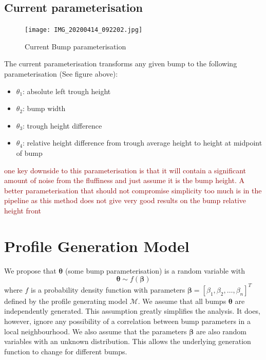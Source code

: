 \documentclass[12pt]{report}
\newcommand{\tcr}[1]{\textcolor{darkRed}{#1}}
\begin{document}
        \subsection{Current parameterisation}
            \begin{figure}
                \centering
                \texttt{[image: IMG\_20200414\_092202.jpg]}
                \caption{Current Bump parameterisation}
            \end{figure}
            The current parameterisation transforms any given bump to the following parameterisation (See figure above):
            \begin{itemize}
                \item $\theta_1$: absolute left trough height
                \item $\theta_2$: bump width
                \item $\theta_3$: trough height difference
                \item $\theta_4$: relative height difference from trough average height to height at midpoint of bump 
            \end{itemize}
            \tcr{one key downside to this parameterisation is that it will contain a significant amount of noise from the fluffiness and just assume it is the bump height. A better parameterisation that should not compromise simplicity too much is in the pipeline as this method does not give very good results on the bump relative height front}
    \section{Profile Generation Model}
        We propose that $\pmb{\theta}$ (some bump parameterisation) is a random variable with
            \[ \pmb{\theta} \sim f(\pmb{\beta}) \]
        where $f$ is a probability density function with parameters $\pmb{\beta} = [\beta_1,\beta_2,\ldots,\beta_n]^T$ defined by the profile generating model $\mathcal{M}$.
        We assume that all bumps $\pmb{\theta}$ are independently generated. This assumption greatly simplifies the analysis. It does, however, ignore any possibility of a correlation between bump parameters in a local neighbourhood. We also assume that the parameters $\pmb{\beta}$ are also random variables with an unknown distribution. This allows the underlying generation function to change for different bumps.
        
\end{document}
